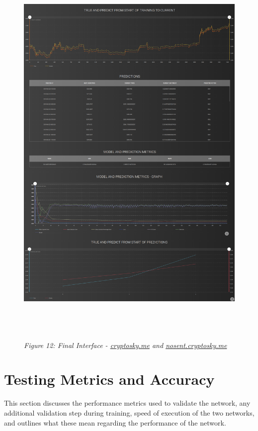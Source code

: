\documentclass[oneside, 12pt]{article}
\begin{document}
		\begin{figure}[hbt!]
			\centering
			\includegraphics[width=14cm,height=19cm]{images/final_interface.png}
			\begin{center}
				\textit{Figure 12: Final Interface - \url{cryptosky.me} and \url{nosent.cryptosky.me}}
			\end{center}
		\end{figure}
		
	\newpage
	
	\section{Testing Metrics and Accuracy}
	This section discusses the performance metrics used to validate the network, any additional validation step during training, speed of execution of the two networks, and outlines what these mean regarding the performance of the network. 
	
\end{document}
